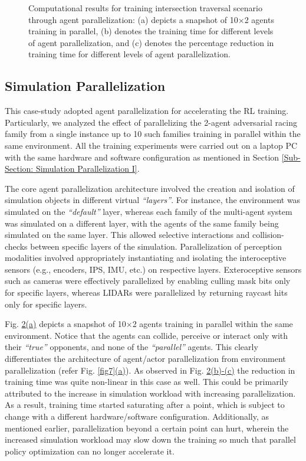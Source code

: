 \documentclass[letterpaper, 10 pt, conference]{ieeeconf}  %
\begin{document}
\begin{figure}[t]
\begin{subfigure}[b]{0.32\linewidth}
         \caption{}
         \label{fig11c}
     \end{subfigure}
     \caption{Computational results for training intersection traversal scenario through agent parallelization: (a) depicts a snapshot of 10$\times$2 agents training in parallel, (b) denotes the training time for different levels of agent parallelization, and (c) denotes the percentage reduction in training time for different levels of agent parallelization.}
    \label{fig11}
\end{figure}

\subsection{Simulation Parallelization}
\label{Sub-Section: Simulation Parallelization II}

This case-study adopted agent parallelization for accelerating the RL training. Particularly, we analyzed the effect of parallelizing the 2-agent adversarial racing family from a single instance up to 10 such families training in parallel within the same environment. All the training experiments were carried out on a laptop PC with the same hardware and software configuration as mentioned in Section \ref{Sub-Section: Simulation Parallelization I}.

The core agent parallelization architecture involved the creation and isolation of simulation objects in different virtual \textit{``layers''}. For instance, the environment was simulated on the \textit{``default''} layer, whereas each family of the multi-agent system was simulated on a different layer, with the agents of the same family being simulated on the same layer. This allowed selective interactions and collision-checks between specific layers of the simulation. Parallelization of perception modalities involved appropriately instantiating and isolating the interoceptive sensors (e.g., encoders, IPS, IMU, etc.) on respective layers. Exteroceptive sensors such as cameras were effectively parallelized by enabling culling mask bits only for specific layers, whereas LIDARs were parallelized by returning raycast hits only for specific layers.

Fig. \hyperref[fig11]{\ref*{fig11}(a)} depicts a snapshot of 10$\times$2 agents training in parallel within the same environment. Notice that the agents can collide, perceive or interact only with their \textit{``true''} opponents, and none of the \textit{``parallel''} agents. This clearly differentiates the architecture of agent/actor parallelization from environment parallelization (refer Fig. \hyperref[fig7]{\ref*{fig7}(a)}). As observed in Fig. \hyperref[fig11]{\ref*{fig11}(b)-(c)} the reduction in training time was quite non-linear in this case as well. This could be primarily attributed to the increase in simulation workload with increasing parallelization. As a result, training time started saturating after a point, which is subject to change with a different hardware/software configuration. Additionally, as mentioned earlier, parallelization beyond a certain point can hurt, wherein the increased simulation workload may slow down the training so much that parallel policy optimization can no longer accelerate it.
\end{document}
